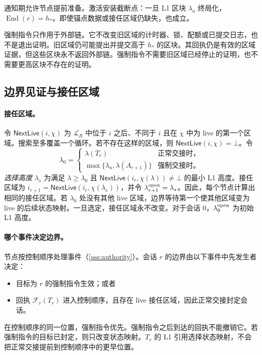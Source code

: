 \documentclass[11pt,a4paper]{article}
\newcommand{\FC}{\mathcal F}
\newcommand{\End}{\operatorname{End}}
\newcommand{\tagg}[1]{\ensuremath{\mathsf{#1}}}
\begin{document}
通知期允许节点提前准备。激活安装截断点：一旦 L1 区块 $\lambda_a$ 终局化，$\End(r)=h_*$。即使锚点数据或接任区域仍缺失，也成立。

强制指令只作用于外部链。它不改变旧区域的计时器、锁、配额或已提交日志，也不是退出证明。旧区域仍可能提出并提交高于 $h_*$ 的区块。其回执仍是有效的区域证据，但这些区块永不返回外部链。强制指令不需要旧区域已经停止的证明，也不需要更高区块不存在的证明。

\subsection{边界见证与接任区域}\label{sec:witness}
\paragraph{接任区域。}
令 $\tagg{NextLive}(i,\chi)$ 为 $\mathcal L_R$ 中位于 $i$ 之后、不同于 $i$ 且在 $\chi$ 中为 live 的第一个区域。搜索至多覆盖一个循环。若不存在这样的区域，则 $\tagg{NextLive}(i,\chi)=\bot$。令
\[
 \lambda_0=\begin{cases}
 \lambda(T_r) & \text{正常交接时，}\\
 \max\{\lambda_a,\lambda(A_{r+1})\} & \text{强制交接时。}
 \end{cases}
\]
\emph{选择高度} $\lambda_s$ 为满足 $\lambda\ge\lambda_0$ 且 $\tagg{NextLive}(i_r,\chi(\lambda))\ne\bot$ 的最小 L1 高度。接任区域为 $i_{r+1}=\tagg{NextLive}(i_r,\chi(\lambda_s))$，并令 $\lambda^{\rm open}_{r+1}=\lambda_s$。因此，每个节点计算出相同的接任区域。若 $\lambda_0$ 处没有其他 live 区域，边界等待第一个使其他区域变为 live 的后续状态映射。一旦选定，接任区域永不改变。对于会话 $0$，$\lambda^{\rm open}_0$ 为初始 L1 高度。

\paragraph{哪个事件决定边界。}
节点按控制顺序处理事件（\cref{ass:authority}）。会话 $r$ 的边界由以下事件中先发生者决定：
\begin{itemize}
\item 目标为 $r$ 的强制指令生效；或者
\item 回执 $\FC_r(T_r)$ 进入控制顺序，且存在 live 接任区域，因此正常交接封定会话。
\end{itemize}
在控制顺序的同一位置，强制指令优先。强制指令之后到达的回执不能撤销它。若强制指令的目标已封定，则只改变状态映射。$T_r$ 的 L1 引用选择状态映射，不会把正常交接提前到控制顺序中的更早位置。
\end{document}

